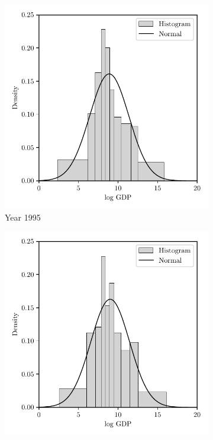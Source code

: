 \begin{figure}[ht]
  \centering
  \begin{subfigure}{0.32\textwidth}
    \centering
    \includegraphics[scale=0.48]{graphics/trade_gdp_1995.pdf}
    \caption{Year 1995}
  \end{subfigure}
  \begin{subfigure}{0.32\textwidth}
    \centering
    \includegraphics[scale=0.48]{graphics/trade_gdp_2000.pdf}

\end{subfigure}
\end{figure}
